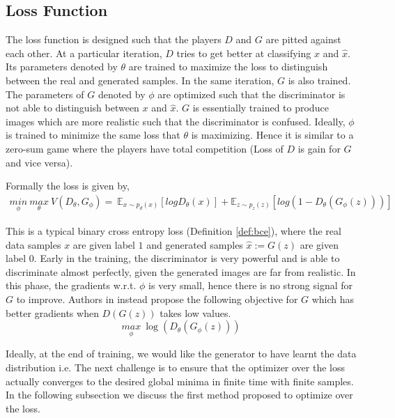 \subsection{Loss Function}
The loss function is designed such that the players $D$ and $G$ are pitted against each other. At a particular iteration, $D$ tries to get better at classifying $x$ and $\hat{x}$. Its parameters denoted by $\theta$ are trained to maximize the loss to distinguish between the real and generated samples. In the same iteration, $G$ is also trained. The parameters of $G$ denoted by $\phi$ are optimized such that the discriminator is not able to distinguish between $x$ and $\hat{x}$. $G$ is essentially trained to produce images which are more realistic such that the discriminator is confused. Ideally, $\phi$  is trained to minimize the same loss that $\theta$ is maximizing. Hence it is similar to a zero-sum game where the players have total competition (Loss of $D$ is gain for $G$ and vice versa).

Formally the loss is given by,
\begin{equation}
    \label{eq:gan_loss1}
    \begin{split}{}
    \underset{\phi}{min}\ \underset{\theta}{max}
\ V(D_{\theta},G_{\phi}) =  \  \mathbb{E}_{x \sim p_{d}(x)}[log D_{\theta}(x)] +  \mathbb{E}_{z \sim p_{z}(z)}[log(1-D_{\theta}(G_{\phi}(z)))]
    \end{split}
\end{equation}{}

This is a typical binary cross entropy loss (Definition \ref{def:bce}), where the real data samples $x$ are given label $1$ and generated samples $\hat{x} := G(z)$ are given label $0$. Early in the training, the discriminator is very powerful and is able to discriminate almost perfectly, given the generated images are far from realistic. In this phase, the gradients w.r.t. $\phi$ is very small, hence there is no strong signal for $G$ to improve. Authors  in \citep{ganGoodfellow} instead propose the following objective for $G$ which has better gradients when $D(G(z))$ takes low values.
\begin{equation}
\label{eq:gan_loss2}
\underset{{\phi}}{max} \ \log(D_{\theta}(G_{\phi}(z)))
\end{equation}

Ideally, at the end of training, we would like the generator to have learnt the data distribution i.e. The next challenge is to ensure that the optimizer over the loss actually converges to the desired global minima in finite time with finite samples.
 In the following subsection we discuss the first method proposed to optimize over the loss.

